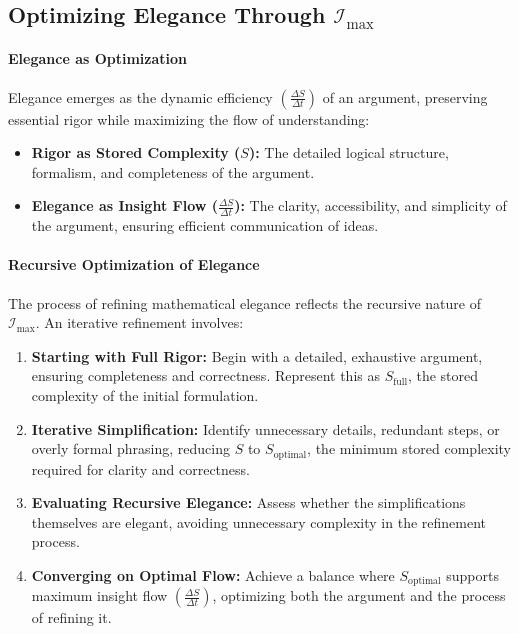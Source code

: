 \documentclass[12pt]{article}
\begin{document}
\subsection{Optimizing Elegance Through \(\mathcal{I}_{\text{max}}\)}

\paragraph{Elegance as Optimization}
Elegance emerges as the dynamic efficiency \(\left(\frac{\Delta S}{\Delta t}\right)\) of an argument, preserving essential rigor while maximizing the flow of understanding:
\begin{itemize}
    \item \textbf{Rigor as Stored Complexity (\(S\)):} The detailed logical structure, formalism, and completeness of the argument.
    \item \textbf{Elegance as Insight Flow (\(\frac{\Delta S}{\Delta t}\)):} The clarity, accessibility, and simplicity of the argument, ensuring efficient communication of ideas.
\end{itemize}

\paragraph{Recursive Optimization of Elegance}
The process of refining mathematical elegance reflects the recursive nature of \(\mathcal{I}_{\text{max}}\). An iterative refinement involves:
\begin{enumerate}
    \item \textbf{Starting with Full Rigor:} Begin with a detailed, exhaustive argument, ensuring completeness and correctness. Represent this as \(S_{\text{full}}\), the stored complexity of the initial formulation.
    \item \textbf{Iterative Simplification:} Identify unnecessary details, redundant steps, or overly formal phrasing, reducing \(S\) to \(S_{\text{optimal}}\), the minimum stored complexity required for clarity and correctness.
    \item \textbf{Evaluating Recursive Elegance:} Assess whether the simplifications themselves are elegant, avoiding unnecessary complexity in the refinement process.
    \item \textbf{Converging on Optimal Flow:} Achieve a balance where \(S_{\text{optimal}}\) supports maximum insight flow \(\left(\frac{\Delta S}{\Delta t}\right)\), optimizing both the argument and the process of refining it.
\end{enumerate}
\end{document}

